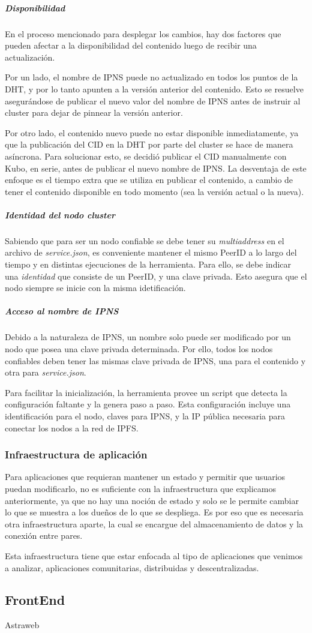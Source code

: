 \subparagraph{Disponibilidad} En el proceso mencionado para desplegar los cambios, hay dos factores que pueden afectar a la disponibilidad del contenido luego de recibir una actualización.

Por un lado, el nombre de IPNS puede no actualizado en todos los puntos de la DHT, y por lo tanto apunten a la versión anterior del contenido. Esto se resuelve asegurándose de publicar el nuevo valor del nombre de IPNS antes de instruir al cluster para dejar de pinnear la versión anterior.

Por otro lado, el contenido nuevo puede no estar disponible inmediatamente, ya que la publicación del CID en la DHT por parte del cluster se hace de manera asíncrona. Para solucionar esto, se decidió publicar el CID manualmente con Kubo, en serie, antes de publicar el nuevo nombre de IPNS. La desventaja de este enfoque es el tiempo extra que se utiliza en publicar el contenido, a cambio de tener el contenido disponible en todo momento (sea la versión actual o la nueva).

\subparagraph{Identidad del nodo cluster} Sabiendo que para ser un nodo confiable se debe tener su \textit{multiaddress} en el archivo de \textit{service.json}, es conveniente mantener el mismo PeerID a lo largo del tiempo y en distintas ejecuciones de la herramienta. Para ello, se debe indicar una \textit{identidad} que consiste de un PeerID, y una clave privada. Esto asegura que el nodo siempre se inicie con la misma idetificación.

\subparagraph{Acceso al nombre de IPNS} Debido a la naturaleza de IPNS, un nombre solo puede ser modificado por un nodo que posea una clave privada determinada. Por ello, todos los nodos confiables deben tener las mismas clave privada de IPNS, una para el contenido y otra para \textit{service.json}.

Para facilitar la inicialización, la herramienta provee un script que detecta la configuración faltante y la genera paso a paso. Esta configuración incluye una identificación para el nodo, claves para IPNS, y la IP pública necesaria para conectar los nodos a la red de IPFS.

\subsubsection{Infraestructura de aplicación}

Para aplicaciones que requieran mantener un estado y permitir que usuarios puedan modificarlo, no es suficiente con la infraestructura que explicamos anteriormente, ya que no hay una noción de estado y solo se le permite cambiar lo que se muestra a los dueños de lo que se despliega. Es por eso que es necesaria otra infraestructura aparte, la cual se encargue del almacenamiento de datos y la conexión entre pares.

Esta infraestructura tiene que estar enfocada al tipo de aplicaciones que venimos a analizar, aplicaciones comunitarias, distribuidas y descentralizadas.





\subsection{FrontEnd}

Astraweb